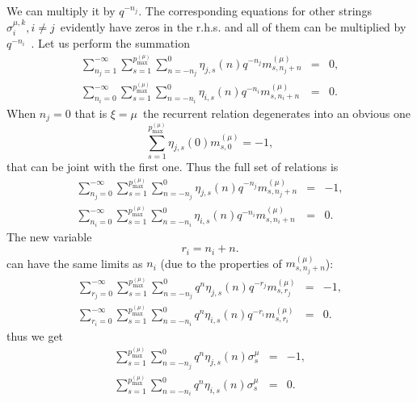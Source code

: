 \documentclass{article}
\begin{document}
We can multiply it by $q^{-n_{j}}$. The corresponding equations for other
strings $\sigma _{i}^{\mu ,k},i\neq j$\ evidently have zeros in the r.h.s.
and all of them can be multiplied by $q^{-n_{i}}$\ . Let us perform the
summation 
\begin{eqnarray*}
\sum_{n_{j}=1}^{-\infty }\sum_{s=1}^{p_{\max }^{\left( \mu \right)
}}\sum_{n=-n_{j}}^{0}\eta _{j,s}\left( n\right)
q^{-n_{j}}m_{s,n_{j}+n}^{\left( \mu \right) } &=&0, \\
\sum_{n_{i}=0}^{-\infty }\sum_{s=1}^{p_{\max }^{\left( \mu \right)
}}\sum_{n=-n_{i}}^{0}\eta _{i,s}\left( n\right)
q^{-n_{i}}m_{s,n_{i}+n}^{\left( \mu \right) } &=&0.
\end{eqnarray*}
When $n_{j}=0$ that is $\xi =\mu $\ the recurrent relation degenerates into
an obvious one 
\begin{equation*}
\sum_{s=1}^{p_{\max }^{\left( \mu \right) }}\eta _{j,s}\left( 0\right)
m_{s,0}^{\left( \mu \right) }=-1,
\end{equation*}
that can be joint with the first one. Thus the full set of relations is 
\begin{eqnarray*}
\sum_{n_{j}=0}^{-\infty }\sum_{s=1}^{p_{\max }^{\left( \mu \right)
}}\sum_{n=-n_{j}}^{0}\eta _{j,s}\left( n\right)
q^{-n_{j}}m_{s,n_{j}+n}^{\left( \mu \right) } &=&-1, \\
\sum_{n_{i}=0}^{-\infty }\sum_{s=1}^{p_{\max }^{\left( \mu \right)
}}\sum_{n=-n_{i}}^{0}\eta _{i,s}\left( n\right)
q^{-n_{i}}m_{s,n_{i}+n}^{\left( \mu \right) } &=&0.
\end{eqnarray*}
The new variable 
\begin{equation*}
r_{i}=n_{i}+n.
\end{equation*}
can have the same limits as $n_{i}$ (due to the properties of $%
m_{s,n_{j}+n}^{\left( \mu \right) }$): 
\begin{eqnarray*}
\sum_{r_{j}=0}^{-\infty }\sum_{s=1}^{p_{\max }^{\left( \mu \right)
}}\sum_{n=-n_{j}}^{0}q^{n}\eta _{j,s}\left( n\right)
q^{-r_{j}}m_{s,r_{j}}^{\left( \mu \right) } &=&-1, \\
\sum_{r_{i}=0}^{-\infty }\sum_{s=1}^{p_{\max }^{\left( \mu \right)
}}\sum_{n=-n_{i}}^{0}q^{n}\eta _{i,s}\left( n\right)
q^{-r_{i}}m_{s,r_{i}}^{\left( \mu \right) } &=&0.
\end{eqnarray*}
thus we get 
\begin{eqnarray*}
\sum_{s=1}^{p_{\max }^{\left( \mu \right) }}\sum_{n=-n_{j}}^{0}q^{n}\eta
_{j,s}\left( n\right) \sigma _{s}^{\mu } &=&-1, \\
\sum_{s=1}^{p_{\max }^{\left( \mu \right) }}\sum_{n=-n_{i}}^{0}q^{n}\eta
_{i,s}\left( n\right) \sigma _{s}^{\mu } &=&0.
\end{eqnarray*}
\end{document}
